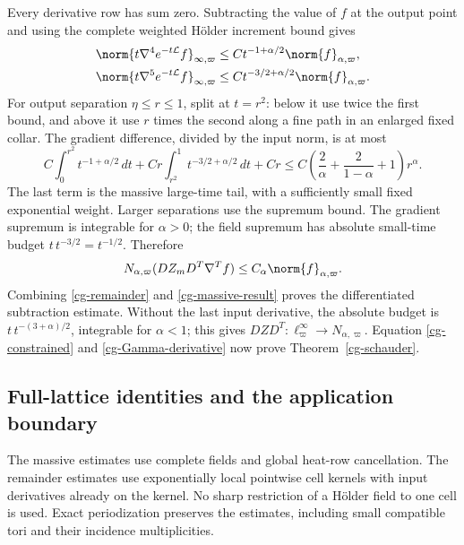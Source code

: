 Every derivative row has sum zero. Subtracting the value of $f$
at the output point and using the complete weighted H\"older
increment bound gives
\begin{align}
 \norm{t\nabla^4e^{-t\mathcal L}f}_{\infty,\varpi}
   &\le Ct^{-1+\alpha/2}\norm{f}_{\alpha,\varpi},\nonumber\\
 \norm{t\nabla^5e^{-t\mathcal L}f}_{\infty,\varpi}
   &\le Ct^{-3/2+\alpha/2}\norm{f}_{\alpha,\varpi}.
                                                        \label{cg-cancellation}
\end{align}
For output separation $\eta\le r\le1$, split at $t=r^2$:
below it use twice the first bound, and above it use $r$ times
the second along a fine path in an enlarged fixed collar.
The gradient difference, divided by the input norm, is at most
\begin{equation}\label{cg-schauder-split}
 C\int_0^{r^2}t^{-1+\alpha/2}\,dt
 +Cr\int_{r^2}^1t^{-3/2+\alpha/2}\,dt+Cr
 \le C\left(\frac2\alpha+\frac2{1-\alpha}+1\right)r^\alpha.
\end{equation}
The last term is the massive large-time tail, with a sufficiently
small fixed exponential weight. Larger separations use the
supremum bound. The gradient supremum is integrable for
$\alpha>0$; the field supremum has absolute small-time budget
$t\,t^{-3/2}=t^{-1/2}$. Therefore
\begin{equation}\label{cg-massive-result}
 N_{\alpha,\varpi}(DZ_mD^T\nabla^Tf)
       \le C_\alpha\norm{f}_{\alpha,\varpi}.
\end{equation}
Combining \eqref{cg-remainder} and \eqref{cg-massive-result}
proves the differentiated subtraction estimate. Without the
last input derivative, the absolute budget is
$t\,t^{-(3+\alpha)/2}$, integrable for $\alpha<1$; this gives
$DZD^T:\ell^\infty_\varpi\to N_{\alpha,\varpi}$.
Equation \eqref{cg-constrained} and
\eqref{cg-Gamma-derivative} now prove
Theorem~\ref{cg-schauder}.

\subsection{Full-lattice identities and the application boundary}

The massive estimates use complete fields and global heat-row
cancellation. The remainder estimates use exponentially local
pointwise cell kernels with input derivatives already on the
kernel. No sharp restriction of a H\"older field to one cell is
used. Exact periodization preserves the estimates, including
small compatible tori and their incidence multiplicities.

